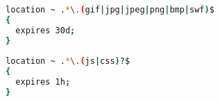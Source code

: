 \begin{lstlisting}[language=bash]
location ~ .*\.(gif|jpg|jpeg|png|bmp|swf)$
{
  expires 30d;
}
  
location ~ .*\.(js|css)?$
{
  expires 1h;
}
\end{lstlisting}




\begin{lstlisting}[language=bash]

\end{lstlisting}




\begin{lstlisting}[language=bash]

\end{lstlisting}




\begin{lstlisting}[language=bash]

\end{lstlisting}





\begin{lstlisting}[language=bash]

\end{lstlisting}




\begin{lstlisting}[language=bash]

\end{lstlisting}




\begin{lstlisting}[language=bash]

\end{lstlisting}




\begin{lstlisting}[language=bash]

\end{lstlisting}





\begin{lstlisting}[language=bash]

\end{lstlisting}




\begin{lstlisting}[language=bash]

\end{lstlisting}




